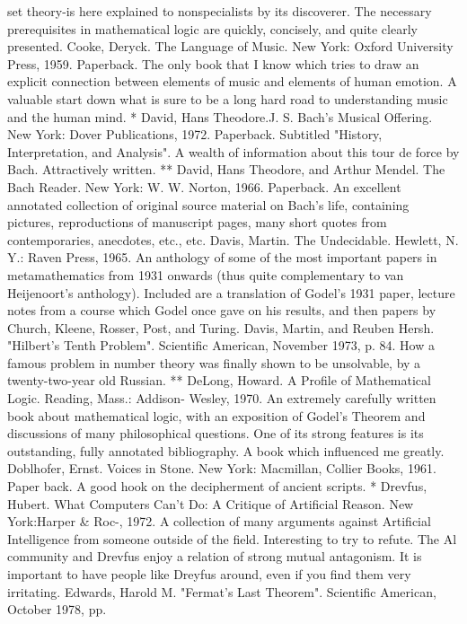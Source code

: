   set theory-is here explained to nonspecialists by its discoverer. The necessary
  prerequisites in mathematical logic are quickly, concisely, and quite clearly presented.
Cooke, Deryck. The Language of Music. New York: Oxford University Press, 1959.
  Paperback. The only book that I know which tries to draw an explicit connection
  between elements of music and elements of human emotion. A valuable start down
  what is sure to be a long hard road to understanding music and the human mind.
* David, Hans Theodore.J. S. Bach's Musical Offering. New York: Dover Publications,
  1972. Paperback. Subtitled "History, Interpretation, and Analysis". A wealth of
  information about this tour de force by Bach. Attractively written.
** David, Hans Theodore, and Arthur Mendel. The Bach Reader. New York: W. W.
  Norton, 1966. Paperback. An excellent annotated collection of original source material
  on Bach's life, containing pictures, reproductions of manuscript pages, many short
  quotes from contemporaries, anecdotes, etc., etc.
Davis, Martin. The Undecidable. Hewlett, N. Y.: Raven Press, 1965. An anthology of
  some of the most important papers in metamathematics from 1931 onwards (thus quite
  complementary to van Heijenoort's anthology). Included are a translation of Godel's
  1931 paper, lecture notes from a course which Godel once gave on his results, and then
  papers by Church, Kleene, Rosser, Post, and Turing.
Davis, Martin, and Reuben Hersh. "Hilbert's Tenth Problem". Scientific American,
  November 1973, p. 84. How a famous problem in number theory was finally shown to
  be unsolvable, by a twenty-two-year old Russian.
** DeLong, Howard. A Profile of Mathematical Logic. Reading, Mass.: Addison-
  Wesley, 1970. An extremely carefully written book about mathematical logic, with an
  exposition of Godel's Theorem and discussions of many philosophical questions. One
  of its strong features is its outstanding, fully annotated bibliography. A book which
  influenced me greatly.
Doblhofer, Ernst. Voices in Stone. New York: Macmillan, Collier Books, 1961. Paper
  back. A good hook on the decipherment of ancient scripts.
* Drevfus, Hubert. What Computers Can't Do: A Critique of Artificial Reason. New
  York:Harper \& Roc-, 1972. A collection of many arguments against Artificial
  Intelligence from someone outside of the field. Interesting to try to refute. The Al
  community and Drevfus enjoy a relation of strong mutual antagonism. It is important to
  have people like Dreyfus around, even if you find them very irritating.
Edwards, Harold M. "Fermat's Last Theorem". Scientific American, October 1978, pp.
